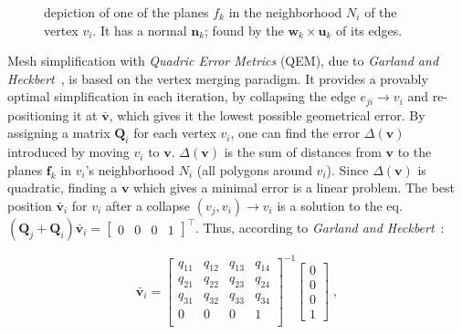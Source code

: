 \begin{figure}[h]
\begin{minipage}{0.485\textwidth}
        \caption{depiction of one of the planes \(f_k\) in the neighborhood \(N_i\) of the vertex \(v_i\). It has a normal \(\mathbf{n}_k\); found by the \(\mathbf{w}_k \times \mathbf{u}_k\) of its edges.}
        \label{fig:quadrics}
    \end{minipage}
\end{figure}

\vspace{-0.7em}

Mesh simplification with \emph{Quadric Error Metrics} (QEM), due to \emph{Garland and Heckbert}~\cite{garland1998simplifying}, is based on the vertex merging paradigm. It provides a provably optimal simplification in each iteration, by collapsing the edge \(e_{ji} \rightarrow v_i\) and re-positioning it at \(\mathbf{\bar{v}}\), which gives it the lowest possible geometrical error. By assigning a matrix \(\mathbf{Q}_i\) for each vertex \(v_i\), one can find the error \(\Delta(\mathbf{v})\) introduced by moving \(v_i\) to \(\mathbf{v}\). \(\Delta(\mathbf{v})\) is the sum of distances from \(\mathbf{v}\) to the planes \(\mathbf{f}_k\) in \(v_i\)'s neighborhood \(N_i\) (all polygons around \(v_i\)). Since \(\Delta(\mathbf{v})\) is quadratic, finding a \(\mathbf{v}\) which gives a minimal error is a linear problem. The best position \(\mathbf{\bar{v}}_i\) for \(v_i\) after a collapse \((v_j, v_i) \rightarrow v_i\) is a solution to the eq. \((\mathbf{Q}_j + \mathbf{Q}_i)\mathbf{\bar{v}}_i = \begin{bmatrix} 0 & 0 & 0 & 1 \end{bmatrix}^\intercal\). Thus, according to \emph{Garland and Heckbert}~\cite{garland1998simplifying}:

    \begin{equation} \bar{\mathbf{v}}_i = \begin{bmatrix}
    q_{11} & q_{12} & q_{13} & q_{14}\\
    q_{21} & q_{22} & q_{23} & q_{24}\\
    q_{31} & q_{32} & q_{33} & q_{34}\\
    0 & 0 & 0 & 1\\
\end{bmatrix}^{-1} \begin{bmatrix} 0 \\
                                   0 \\
                                   0 \\
    1 \end{bmatrix} \; ,\end{equation}

